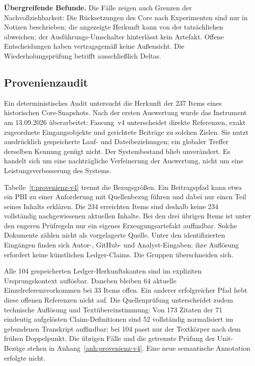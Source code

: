 \textbf{Übergreifende Befunde.} Die Fälle zeigen auch Grenzen der
Nachvollziehbarkeit: Die Rücksetzungen des Core nach Experimenten
sind nur in Notizen beschrieben; die angezeigte Herkunft kann von
der tatsächlichen abweichen; der Ausführungs-Umschalter hinterlässt
kein Artefakt. Offene Entscheidungen haben vertragsgemäß keine
Außensicht. Die Wiederholungsprüfung betrifft ausschließlich Deltas.

\subsection{Provenienzaudit}
\label{sec:eval-provenienz}

Ein deterministisches Audit untersucht die Herkunft der 237 Items
eines historischen Core-Snapshots. Nach der ersten Auswertung wurde
das Instrument am 13.09.2026 überarbeitet: Fassung~v4 unterscheidet
direkte Referenzen, exakt zugeordnete Eingangsobjekte und gerichtete
Beiträge zu solchen Zielen. Sie nutzt ausdrücklich gespeicherte
Lauf- und Dateibeziehungen; ein globaler Treffer derselben Kennung
genügt nicht. Der Systembestand blieb unverändert. Es handelt sich
um eine nachträgliche Verfeinerung der Auswertung, nicht um eine
Leistungsverbesserung des Systems.



Tabelle~\ref{t:provenienz-v4} trennt die Bezugsgrößen. Ein
Beitragspfad kann etwa ein PBI zu einer Anforderung mit Quellenbezug
führen und dabei nur einen Teil seines Inhalts erklären.
Die 234 erreichten Items sind deshalb keine 234 vollständig
nachgewiesenen aktuellen Inhalte. Bei den drei übrigen Items ist
unter den engeren Prüfregeln nur ein eigenes Erzeugungsartefakt
auffindbar. Solche Dokumente zählen nicht als vorgelagerte Quelle.
Unter den identifizierten Eingängen finden sich Autor-, GitHub-
und Analyst-Eingaben; ihre Auflösung erfordert keine künstlichen
Ledger-Claims. Die Gruppen überschneiden sich.

Alle 104 gespeicherten Ledger-Herkunftskanten sind im expliziten
Ursprungskontext auflösbar. Daneben bleiben 64 aktuelle
Einzelreferenzvorkommen bei 33 Items offen. Ein anderer erfolgreicher
Pfad hebt diese offenen Referenzen nicht auf. Die Quellenprüfung
unterscheidet zudem technische Auflösung und Textübereinstimmung:
Von 173 Zitaten der 71 eindeutig aufgelösten Claim-Definitionen sind
52 vollständig normalisiert im gebundenen Transkript auffindbar;
bei 104 passt nur der Textkörper nach dem frühen Doppelpunkt.
Die übrigen Fälle und die getrennte Prüfung der Unit-Bezüge stehen
in Anhang~\ref{anh:provenienz-v4}. Eine neue semantische
Annotation erfolgte nicht.

